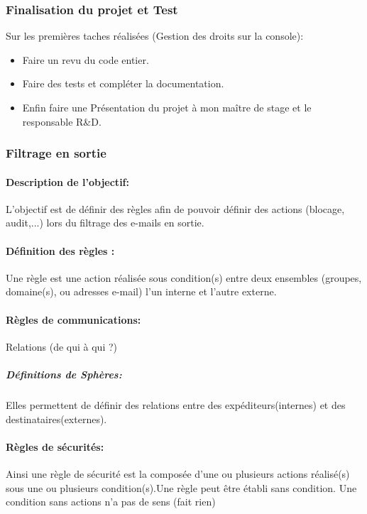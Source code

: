 \subsubsection{Finalisation du projet et Test}
Sur les premières taches réalisées (Gestion des droits sur la console):
\begin{itemize}
\item Faire un revu du code entier.
\item Faire des tests et compléter la documentation.
\item Enfin faire une Présentation du projet à mon  maître de stage et le responsable R\&D. 
\end{itemize}
\subsubsection{Filtrage en sortie}
\paragraph{Description de l'objectif:} L'objectif est de définir des règles afin de pouvoir définir des actions (blocage, audit,...) lors du filtrage des e-mails en sortie.
\paragraph{Définition des règles :}
Une règle est une action réalisée sous condition(s) entre deux ensembles (groupes, domaine(s), ou adresses e-mail) l'un interne et l'autre externe. 
\paragraph{Règles de communications:}Relations (de qui à qui ?)
\subparagraph{Définitions de Sphères:} Elles permettent de définir des relations entre des expéditeurs(internes) et des destinataires(externes).
\paragraph{Règles de sécurités: } Ainsi une règle de sécurité est la composée d'une ou plusieurs actions réalisé(s) sous une ou plusieurs condition(s).Une règle peut être établi sans condition. Une condition sans actions n'a pas de sens (fait rien)

